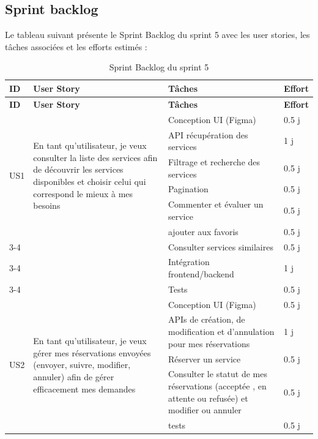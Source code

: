 \subsection{Sprint backlog}  
Le tableau suivant présente le Sprint Backlog du sprint 5 avec les user stories, les tâches associées et
les efforts estimés : 

\begin{longtable}{|p{2cm}|p{5cm}|p{6cm}|p{2cm}|}
\caption{Sprint Backlog du sprint 5}
\label{tab:sprint-anicare-backlog} \\ 
\hline
\rowcolor{coloranicare}
\textbf{ID} & \textbf{User Story} & \textbf{Tâches} & \textbf{Effort} \\
\hline
\endfirsthead

\hline
\rowcolor{coloranicare}
\textbf{ID} & \textbf{User Story} & \textbf{Tâches} & \textbf{Effort} \\
\hline
\endhead

\multirow{6}{2cm}{US1}
& \multirow{6}{5cm}{En tant qu’utilisateur, je veux consulter la liste des services afin de découvrir les services disponibles et choisir celui qui correspond le mieux à mes besoins}
& Conception UI (Figma) & 0.5 j \\
\cline{3-4}
& & API récupération des services & 1 j \\
\cline{3-4}
& & Filtrage et recherche des services & 0.5 j \\
\cline{3-4}
& & Pagination & 0.5 j \\
\cline{3-4}
& & Commenter et évaluer un service & 0.5 j \\ 
\cline{3-4}
& & ajouter aux favoris & 0.5 j \\
\cline{3-4} 
& & Consulter services similaires & 0.5 j \\
\cline{3-4} 
& & Intégration frontend/backend & 1 j \\
\cline{3-4}
& & Tests & 0.5 j \\
\hline

\multirow{7}{2cm}{US2}
& \multirow{7}{5cm}{En tant qu’utilisateur, je veux gérer mes réservations envoyées (envoyer, suivre, modifier, annuler) afin de gérer efficacement mes demandes}
& Conception UI (Figma) & 0.5 j \\
\cline{3-4}
& & APIs de création, de modification et d’annulation pour mes réservations & 1 j \\
\cline{3-4} 
& & Réserver un service & 0.5 j \\
\cline{3-4}
& & Consulter le statut de mes réservations (acceptée , en attente ou refusée) et modifier ou annuler & 0.5 j \\
\cline{3-4}
& & tests & 0.5 j \\
\hline


\end{longtable}
